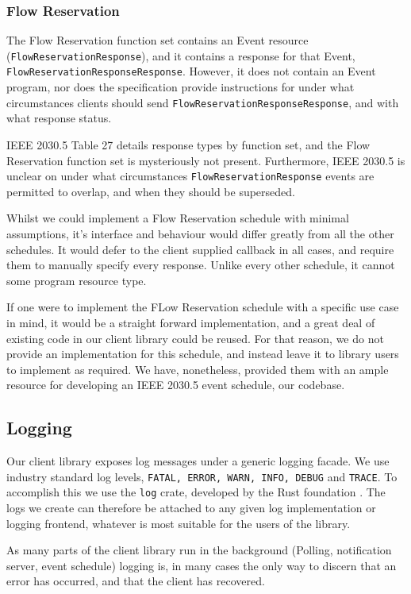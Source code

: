 \subsubsection{Flow Reservation}
The Flow Reservation function set contains an Event resource (\texttt{FlowReservationResponse}), and it contains a response for that Event, \texttt{FlowReservationResponseResponse}. However, it does not contain an Event program, nor does the specification provide instructions for under what circumstances clients should send \texttt{FlowReservationResponseResponse}, and with what response status.

IEEE 2030.5 Table 27 details response types by function set, and the Flow Reservation function set is mysteriously not present. Furthermore, IEEE 2030.5 is unclear on under what circumstances \texttt{FlowReservationResponse} events are permitted to overlap, and when they should be superseded. 

Whilst we could implement a Flow Reservation schedule with minimal assumptions, it's interface and behaviour would differ greatly from all the other schedules. It would defer to the client supplied callback in all cases, and require them to manually specify every response. Unlike every other schedule, it cannot some program resource type.

If one were to implement the FLow Reservation schedule with a specific use case in mind, it would be a straight forward implementation, and a great deal of existing code in our client library could be reused. For that reason, we do not provide an implementation for this schedule, and instead leave it to library users to implement as required. We have, nonetheless, provided them with an ample resource for developing an IEEE 2030.5 event schedule, our codebase.

\subsection{Logging}
Our client library exposes log messages under a generic logging facade. We use industry standard log levels, \texttt{FATAL, ERROR, WARN, INFO, DEBUG} and \texttt{TRACE}. To accomplish this we use the \texttt{log} crate, developed by the Rust foundation \cite{logcrate}. The logs we create can therefore be attached to any given log implementation or logging frontend, whatever is most suitable for the users of the library.

As many parts of the client library run in the background (Polling, notification server, event schedule) logging is, in many cases the only way to discern that an error has occurred, and that the client has recovered. 

